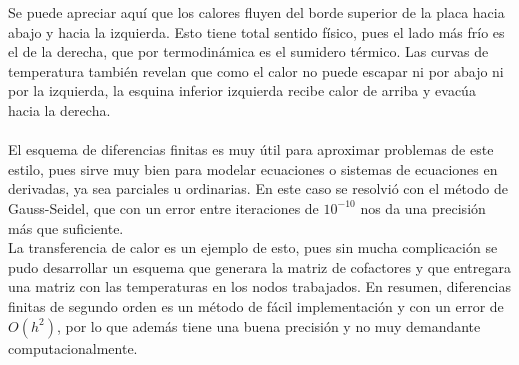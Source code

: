 \documentclass[12pt, notitlepage]{article}
\begin{document}
Se puede apreciar aquí que los calores fluyen del borde superior de la placa hacia abajo y hacia la izquierda. Esto tiene total sentido físico, pues el lado más frío es el de la derecha, que por termodinámica es el sumidero térmico. Las curvas de temperatura también revelan que como el calor no puede escapar ni por abajo ni por la izquierda, la esquina inferior izquierda recibe calor de arriba y evacúa hacia la derecha.\\\\
El esquema de diferencias finitas es muy útil para aproximar problemas de este estilo, pues sirve muy bien para modelar ecuaciones o sistemas de ecuaciones en derivadas, ya sea parciales u ordinarias. En este caso se resolvió con el método de Gauss-Seidel, que con un error entre iteraciones de $10^{-10}$ nos da una precisión más que suficiente.\\ La transferencia de calor es un ejemplo de esto, pues sin mucha complicación se pudo desarrollar un esquema que generara la matriz de cofactores y que entregara una matriz con las temperaturas en los nodos trabajados. En resumen, diferencias finitas de segundo orden es un método de fácil implementación y con un error de $O(h^2)$, por lo que además tiene una buena precisión y no muy demandante computacionalmente.
\end{document}
